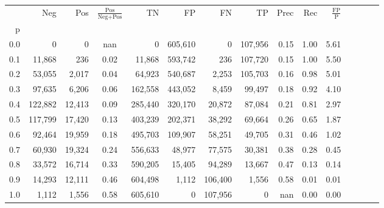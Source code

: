 \begin{tabular}{rrrcrrrrrrrrrrr}
\toprule
{} &      Neg &     Pos & $\frac{\text{Pos}}{\text{Neg}+\text{Pos}}$ &       TN &       FP &       FN &       TP &  Prec &   Rec & $\frac{\text{FP}}{\text{P}}$ \\
p   &          &         &                                            &          &          &          &          &       &       &                              \\
\midrule
0.0 &        0 &       0 &                                        nan &        0 &  605,610 &        0 &  107,956 &  0.15 &  1.00 &                         5.61 \\
0.1 &   11,868 &     236 &                                       0.02 &   11,868 &  593,742 &      236 &  107,720 &  0.15 &  1.00 &                         5.50 \\
0.2 &   53,055 &   2,017 &                                       0.04 &   64,923 &  540,687 &    2,253 &  105,703 &  0.16 &  0.98 &                         5.01 \\
0.3 &   97,635 &   6,206 &                                       0.06 &  162,558 &  443,052 &    8,459 &   99,497 &  0.18 &  0.92 &                         4.10 \\
0.4 &  122,882 &  12,413 &                                       0.09 &  285,440 &  320,170 &   20,872 &   87,084 &  0.21 &  0.81 &                         2.97 \\
0.5 &  117,799 &  17,420 &                                       0.13 &  403,239 &  202,371 &   38,292 &   69,664 &  0.26 &  0.65 &                         1.87 \\
0.6 &   92,464 &  19,959 &                                       0.18 &  495,703 &  109,907 &   58,251 &   49,705 &  0.31 &  0.46 &                         1.02 \\
0.7 &   60,930 &  19,324 &                                       0.24 &  556,633 &   48,977 &   77,575 &   30,381 &  0.38 &  0.28 &                         0.45 \\
0.8 &   33,572 &  16,714 &                                       0.33 &  590,205 &   15,405 &   94,289 &   13,667 &  0.47 &  0.13 &                         0.14 \\
0.9 &   14,293 &  12,111 &                                       0.46 &  604,498 &    1,112 &  106,400 &    1,556 &  0.58 &  0.01 &                         0.01 \\
1.0 &    1,112 &   1,556 &                                       0.58 &  605,610 &        0 &  107,956 &        0 &   nan &  0.00 &                         0.00 \\
\bottomrule
\end{tabular}
